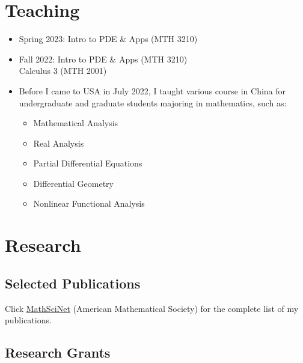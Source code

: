 \documentclass[12pt]{amsproc}
\begin{document}
\section{Teaching}

\begin{itemize}
\item Spring 2023: Intro to PDE \& Apps (MTH 3210)
\item Fall 2022: Intro to PDE \& Apps (MTH 3210)\\
Calculus 3 (MTH 2001)
\item Before I came to USA in July 2022, I taught various course in China for undergraduate and graduate students majoring in mathematics, such as:
\begin{multicols}{2}
\begin{itemize}
\item Mathematical Analysis\\
\item Real Analysis\\
\item Partial Differential Equations\\
\item Differential Geometry\\
\item Nonlinear Functional Analysis
\end{itemize}
\end{multicols}


\end{itemize}

\section{Research}

\subsection{Selected Publications}

Click \href{https://mathscinet.ams.org/mathscinet/search/author.html?mrauthid=671940}{MathSciNet} (American Mathematical Society) for the complete list of my publications.


\nocite{*}


\subsection{Research Grants}
\end{document}
